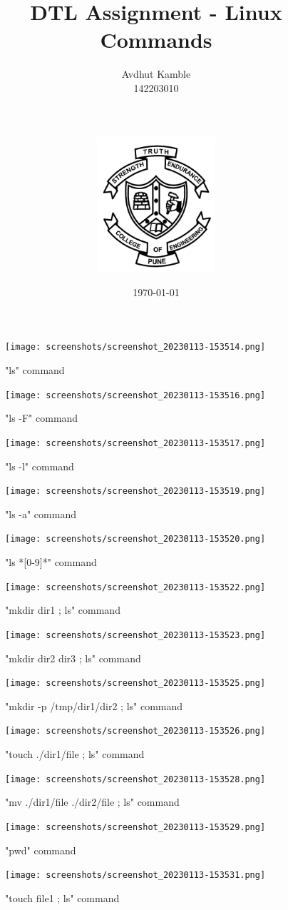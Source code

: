 \documentclass[b5paper]{article}
\title{DTL Assignment - Linux Commands}
\author{Avdhut Kamble  \\ 142203010 \\	\\ \\ \\ 	\includegraphics[height=5cm]{COEP.png}}
\date{\today}
\begin{document}
	\maketitle
	\newpage
	\begin{figure} \centering \texttt{[image: screenshots/screenshot\_20230113-153514.png]} \caption{"ls" command} \end{figure}
\begin{figure} \centering \texttt{[image: screenshots/screenshot\_20230113-153516.png]} \caption{"ls -F" command} \end{figure}
\begin{figure} \centering \texttt{[image: screenshots/screenshot\_20230113-153517.png]} \caption{"ls -l" command} \end{figure}
\begin{figure} \centering \texttt{[image: screenshots/screenshot\_20230113-153519.png]} \caption{"ls -a" command} \end{figure}
\begin{figure} \centering \texttt{[image: screenshots/screenshot\_20230113-153520.png]} \caption{"ls *[0-9]*" command} \end{figure}
\begin{figure} \centering \texttt{[image: screenshots/screenshot\_20230113-153522.png]} \caption{"mkdir dir1 ; ls" command} \end{figure}
\begin{figure} \centering \texttt{[image: screenshots/screenshot\_20230113-153523.png]} \caption{"mkdir dir2 dir3 ; ls" command} \end{figure}
\begin{figure} \centering \texttt{[image: screenshots/screenshot\_20230113-153525.png]} \caption{"mkdir -p /tmp/dir1/dir2 ; ls" command} \end{figure}
\begin{figure} \centering \texttt{[image: screenshots/screenshot\_20230113-153526.png]} \caption{"touch ./dir1/file ; ls" command} \end{figure}
\begin{figure} \centering \texttt{[image: screenshots/screenshot\_20230113-153528.png]} \caption{"mv ./dir1/file ./dir2/file ; ls" command} \end{figure}
\begin{figure} \centering \texttt{[image: screenshots/screenshot\_20230113-153529.png]} \caption{"pwd" command} \end{figure}
\begin{figure} \centering \texttt{[image: screenshots/screenshot\_20230113-153531.png]} \caption{"touch file1 ; ls" command} \end{figure}
\end{document}
